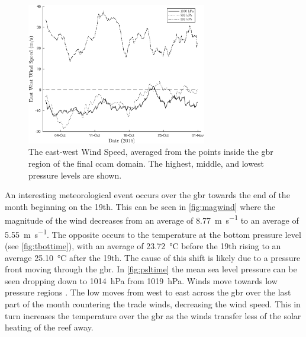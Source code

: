 	\begin{figure}[!htb]
	    \centering
	    \includegraphics[width=0.7\textwidth]{Fig/Research/CCAM/GBRAveragedPlot_multilevelwind.eps}
	    \caption{ The east-west Wind Speed, averaged from the points inside the \gls{gbr} region of the final \gls{ccam} domain. The 	highest, middle, and lowest pressure levels are shown. }
	    \label{fig:multiwind}
	\end{figure}

	An interesting meteorological event occurs over the \gls{gbr} towards the end of the month beginning on the 19th. This can be seen in \cref{fig:magwind} where the magnitude of the wind decreases from an average of \SI[per-mode=symbol]{8.77}{\meter\per\second} to an average of \SI[per-mode=symbol]{5.55}{\meter\per\second}. The opposite occurs to the temperature at the bottom pressure level (see \cref{fig:tbottime}), with an average of \SI{23.72}{\celsius} before the 19th rising to an average \SI{25.10}{\celsius} after the 19th. The cause of this shift is likely due to a pressure front moving through the \gls{gbr}. In \cref{fig:psltime} the mean sea level pressure can be seen dropping down to \SI{1014}{hPa} from \SI{1019}{hPa}. Winds move towards low pressure regions \citep{seinfeld2012atmospheric}. The low moves from west to east across the \gls{gbr} over the last part of the month countering the trade winds, decreasing the wind speed. This in turn increases the temperature over the \gls{gbr} as the winds transfer less of the solar heating of the reef away.

